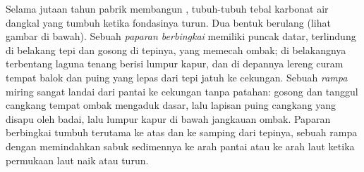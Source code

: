 Selama jutaan tahun pabrik membangun , tubuh-tubuh tebal karbonat air dangkal yang tumbuh ketika fondasinya turun. Dua bentuk berulang
(lihat gambar di bawah). Sebuah \emph{paparan berbingkai} memiliki puncak datar, terlindung di belakang tepi  dan gosong  di tepinya, yang memecah ombak; di belakangnya terbentang laguna tenang berisi lumpur kapur, dan di depannya lereng curam tempat balok dan puing yang lepas dari tepi jatuh ke cekungan. Sebuah \emph{rampa} miring sangat landai dari pantai ke cekungan tanpa patahan: gosong  dan tanggul cangkang tempat ombak mengaduk dasar, lalu lapisan puing cangkang yang disapu oleh badai, lalu lumpur kapur di bawah jangkauan ombak. Paparan berbingkai tumbuh terutama ke atas dan ke samping dari tepinya, sebuah rampa dengan memindahkan sabuk sedimennya ke arah pantai atau ke arah laut ketika permukaan laut naik atau turun.

